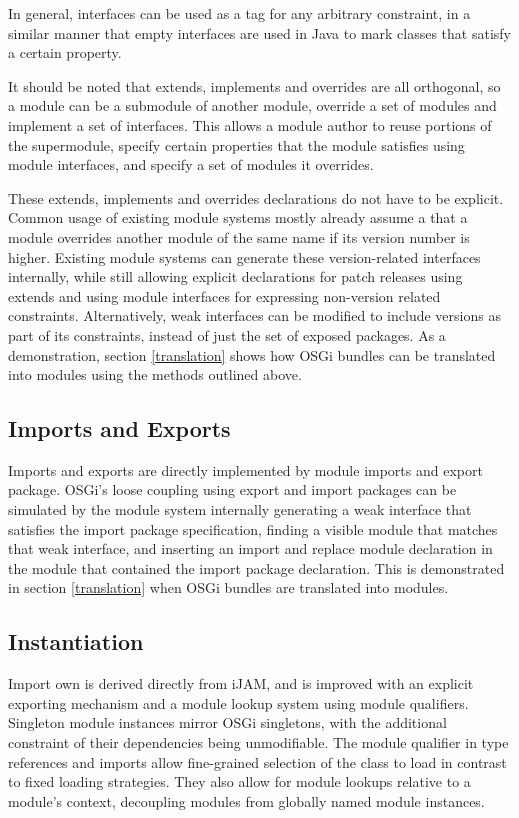 In general, interfaces can be used as a tag for any arbitrary constraint, 
in a similar manner that empty interfaces are used in Java to mark classes 
that satisfy a certain property.

It should be noted that extends, implements and overrides are all orthogonal,
so a module can be a submodule of another module, override a set of modules and
implement a set of interfaces. This allows a module author to reuse portions
of the supermodule, specify certain properties that the module satisfies
using module interfaces, and specify a set of modules it overrides.

These extends, implements and overrides declarations do not have to be explicit.
Common usage of existing module systems mostly already assume a that a 
module overrides another module of the same name if its version 
number is higher. Existing module systems can generate these version-related interfaces 
internally, while still allowing explicit declarations for patch releases 
using extends and using module interfaces for expressing non-version
related constraints. Alternatively, weak interfaces can be modified to include
versions as part of its constraints, instead of just the set of exposed packages.
As a demonstration, section \ref{translation} shows how OSGi bundles can be
translated into modules using the methods outlined above.

\subsection{Imports and Exports}

Imports and exports are directly implemented by module imports and export package.
OSGi's loose coupling using export and import packages can be simulated by
the module system internally generating a weak interface that satisfies the import
package specification, finding a visible module that matches that weak interface, and
inserting an import and replace module declaration in the module that contained the import package
declaration. This is demonstrated in section \ref{translation} when OSGi bundles are 
translated into modules.

\subsection{Instantiation}

Import own is derived directly from iJAM, and is improved with an explicit exporting 
mechanism and a module lookup system using module qualifiers. Singleton module instances mirror
OSGi singletons, with the additional constraint of their dependencies being unmodifiable. 
The module qualifier in type references and
imports allow fine-grained selection of the class to load in contrast
to fixed loading strategies. They also allow for module lookups relative to
a module's context, decoupling modules from globally named module instances.


